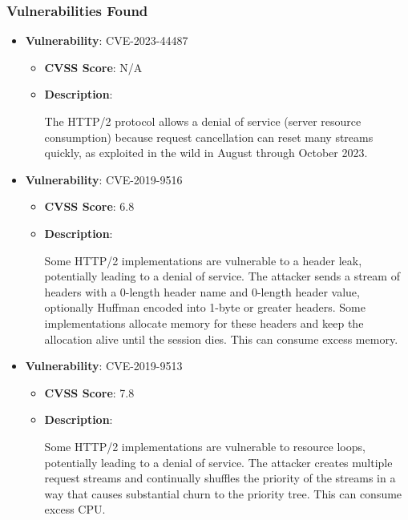 \documentclass{article}
\begin{document}
\subsubsection*{Vulnerabilities Found}

\begin{itemize}
    
        \item \textbf{Vulnerability}: CVE-2023-44487
        \begin{itemize}
            \item \textbf{CVSS Score}:  N/A 
            \item \textbf{Description}:
            \parbox[t]{0.9\linewidth}{
                \ttfamily The HTTP/2 protocol allows a denial of service (server resource consumption) because request cancellation can reset many streams quickly, as exploited in the wild in August through October 2023.
            }
        \end{itemize}
    
        \item \textbf{Vulnerability}: CVE-2019-9516
        \begin{itemize}
            \item \textbf{CVSS Score}:  6.8 
            \item \textbf{Description}:
            \parbox[t]{0.9\linewidth}{
                \ttfamily Some HTTP/2 implementations are vulnerable to a header leak, potentially leading to a denial of service. The attacker sends a stream of headers with a 0-length header name and 0-length header value, optionally Huffman encoded into 1-byte or greater headers. Some implementations allocate memory for these headers and keep the allocation alive until the session dies. This can consume excess memory.
            }
        \end{itemize}
    
        \item \textbf{Vulnerability}: CVE-2019-9513
        \begin{itemize}
            \item \textbf{CVSS Score}:  7.8 
            \item \textbf{Description}:
            \parbox[t]{0.9\linewidth}{
                \ttfamily Some HTTP/2 implementations are vulnerable to resource loops, potentially leading to a denial of service. The attacker creates multiple request streams and continually shuffles the priority of the streams in a way that causes substantial churn to the priority tree. This can consume excess CPU.
            }
        \end{itemize}
    

\end{itemize}
\end{document}
